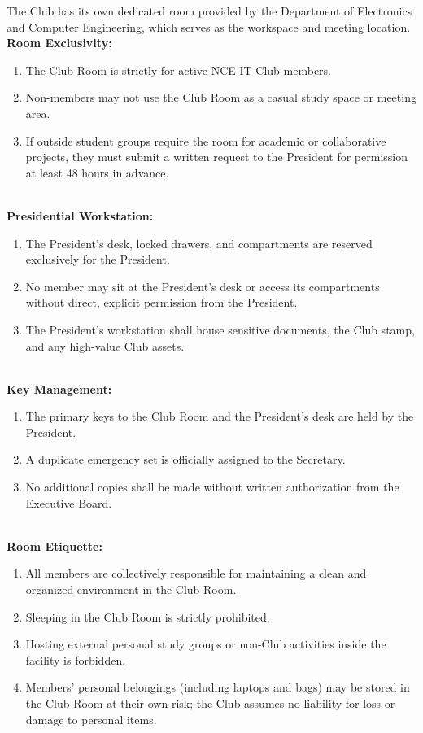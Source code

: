 
The Club has its own dedicated room provided by the Department of Electronics and Computer Engineering, which serves as the workspace and meeting location.
\\
\textbf{Room Exclusivity:}
\begin{enumerate}[label=\alph*), leftmargin=2em, itemsep=0.3em]
    \item The Club Room is strictly for active NCE IT Club members.
    \item Non-members may not use the Club Room as a casual study space or meeting area.
    \item If outside student groups require the room for academic or collaborative projects, they must submit a written request to the President for permission at least 48 hours in advance.
\end{enumerate}
\\
\textbf{Presidential Workstation:}
\begin{enumerate}[label=\alph*), leftmargin=2em, itemsep=0.3em]
    \item The President's desk, locked drawers, and compartments are reserved exclusively for the President.
    \item No member may sit at the President's desk or access its compartments without direct, explicit permission from the President.
    \item The President's workstation shall house sensitive documents, the Club stamp, and any high-value Club assets.
\end{enumerate}
\\
\textbf{Key Management:}
\begin{enumerate}[label=\alph*), leftmargin=2em, itemsep=0.3em]
    \item The primary keys to the Club Room and the President's desk are held by the President.
    \item A duplicate emergency set is officially assigned to the Secretary.
    \item No additional copies shall be made without written authorization from the Executive Board.
\end{enumerate}
\\
\textbf{Room Etiquette:}
\begin{enumerate}[label=\alph*), leftmargin=2em, itemsep=0.3em]
    \item All members are collectively responsible for maintaining a clean and organized environment in the Club Room.
    \item Sleeping in the Club Room is strictly prohibited.
    \item Hosting external personal study groups or non-Club activities inside the facility is forbidden.
    \item Members' personal belongings (including laptops and bags) may be stored in the Club Room at their own risk; the Club assumes no liability for loss or damage to personal items.
\end{enumerate}

